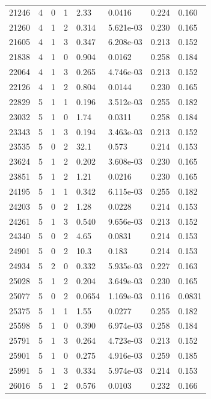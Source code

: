\documentclass[preview]{standalone}
\begin{document}
{{{\begin{tabular}{L{1.2cm}C{1.2cm} C{0.3cm}C{0.5cm} C{1.4cm}C{1.4cm} C{1.4cm}C{1.4cm}}
  21246  &     4  & 0     &  1 &  2.33  & 0.0416  & 0.224 &  0.160   \\ 
  21260  &     4  & 1     &  2 &  0.314  & 5.621e-03  & 0.230 &  0.165   \\ 
  21605  &     4  & 1     &  3 &  0.347  & 6.208e-03  & 0.213 &  0.152   \\ 
  21838  &     4  & 1     &  0 &  0.904  & 0.0162  & 0.258 &  0.184   \\ 
  22064  &     4  & 1     &  3 &  0.265  & 4.746e-03  & 0.213 &  0.152   \\ 
  22126  &     4  & 1     &  2 &  0.804  & 0.0144  & 0.230 &  0.165   \\ 
  22829  &     5  & 1     &  1 &  0.196  & 3.512e-03  & 0.255 &  0.182   \\ 
  23032  &     5  & 1     &  0 &  1.74  & 0.0311  & 0.258 &  0.184   \\ 
  23343  &     5  & 1     &  3 &  0.194  & 3.463e-03  & 0.213 &  0.152   \\ 
  23535  &     5  & 0     &  2 &  32.1  & 0.573  & 0.214 &  0.153   \\ 
  23624  &     5  & 1     &  2 &  0.202  & 3.608e-03  & 0.230 &  0.165   \\ 
  23851  &     5  & 1     &  2 &  1.21  & 0.0216  & 0.230 &  0.165   \\ 
  24195  &     5  & 1     &  1 &  0.342  & 6.115e-03  & 0.255 &  0.182   \\ 
  24203  &     5  & 0     &  2 &  1.28  & 0.0228  & 0.214 &  0.153   \\ 
  24261  &     5  & 1     &  3 &  0.540  & 9.656e-03  & 0.213 &  0.152   \\ 
  24340  &     5  & 0     &  2 &  4.65  & 0.0831  & 0.214 &  0.153   \\ 
  24901  &     5  & 0     &  2 &  10.3  & 0.183  & 0.214 &  0.153   \\ 
  24934  &     5  & 2     &  0 &  0.332  & 5.935e-03  & 0.227 &  0.163   \\ 
  25028  &     5  & 1     &  2 &  0.204  & 3.649e-03  & 0.230 &  0.165   \\ 
  25077  &     5  & 0     &  2 &  0.0654  & 1.169e-03  & 0.116 &  0.0831   \\ 
  25375  &     5  & 1     &  1 &  1.55  & 0.0277  & 0.255 &  0.182   \\ 
  25598  &     5  & 1     &  0 &  0.390  & 6.974e-03  & 0.258 &  0.184   \\ 
  25791  &     5  & 1     &  3 &  0.264  & 4.723e-03  & 0.213 &  0.152   \\ 
  25901  &     5  & 1     &  0 &  0.275  & 4.916e-03  & 0.259 &  0.185   \\ 
  25991  &     5  & 1     &  3 &  0.334  & 5.974e-03  & 0.214 &  0.153   \\ 
  26016  &     5  & 1     &  2 &  0.576  & 0.0103  & 0.232 &  0.166   \\ 
\hline 
\end{tabular} 

}}}
\end{document}

